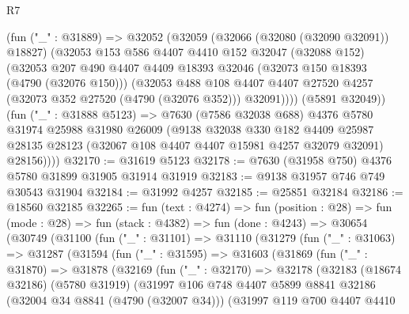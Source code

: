 \begin{lexlean}{R7}
\begin{coremodule}
        (fun ("_" : @31889) =>
        @32052
          (@32059
            (@32066 (@32080 (@32090 @32091)) @18827)
            (@32053
              @153
              @586
              @4407
              @4410
              @152
              @32047
              (@32088 @152)
              (@32053
                @207
                @490
                @4407
                @4409
                @18393
                @32046
                (@32073 @150 @18393 (@4790 (@32076 @150)))
                (@32053
                  @488
                  @108
                  @4407
                  @4407
                  @27520
                  @4257
                  (@32073 @352 @27520 (@4790 (@32076 @352)))
                  @32091))))
          (@5891 @32049))
        (fun ("_" : @31888 @5123) =>
        @7630
          (@7586 @32038 @688)
          @4376
          @5780
          @31974
          @25988
          @31980
          @26009
          (@9138
            @32038
            @330
            @182
            @4409
            @25987
            @28135
            @28123
            (@32067 @108 @4407 @4407 @15981 @4257 @32079 @32091)
            @28156))))
@32170 := @31619 @5123
@32178 := @7630 (@31958 @750) @4376 @5780 @31899 @31905 @31914 @31919
@32183 := @9138 @31957 @746 @749 @30543 @31904
@32184 := @31992 @4257
@32185 := @25851 @32184
@32186 := @18560 @32185
@32265 := fun (text : @4274) =>
  fun (position : @28) =>
  fun (mode : @28) =>
  fun (stack : @4382) =>
  fun (done : @4243) =>
  @30654
    (@30749
      (@31100
        (fun ("_" : @31101) =>
        @31110
          (@31279
            (fun ("_" : @31063) =>
            @31287
              (@31594
                (fun ("_" : @31595) =>
                @31603
                  (@31869
                    (fun ("_" : @31870) =>
                    @31878
                      (@32169
                        (fun ("_" : @32170) =>
                        @32178
                          (@32183
                            (@18674 @32186)
                            (@5780 @31919)
                            (@31997
                              @106
                              @748
                              @4407
                              @5899
                              @8841
                              @32186
                              (@32004 @34 @8841 (@4790 (@32007 @34)))
                              (@31997
                                @119
                                @700
                                @4407
                                @4410

\end{coremodule}
\end{lexlean}
